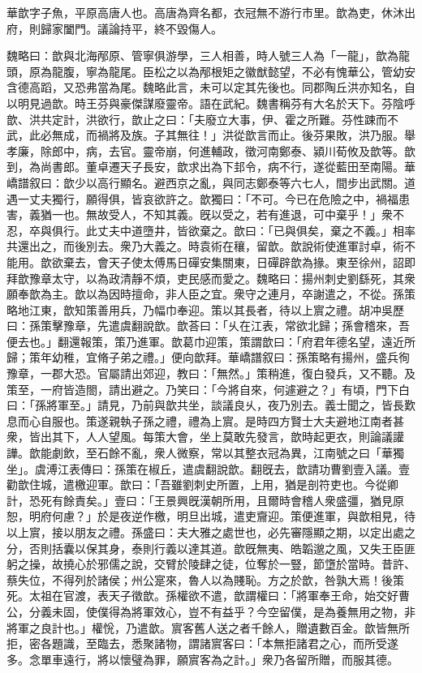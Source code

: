 
\begin{pinyinscope}
華歆字子魚，平原高唐人也。高唐為齊名都，衣冠無不游行市里。歆為吏，休沐出府，則歸家闔門。議論持平，終不毀傷人。

魏略曰：歆與北海邴原、管寧俱游學，三人相善，時人號三人為「一龍」，歆為龍頭，原為龍腹，寧為龍尾。臣松之以為邴根矩之徽猷懿望，不必有愧華公，管幼安含德高蹈，又恐弗當為尾。魏略此言，未可以定其先後也。同郡陶丘洪亦知名，自以明見過歆。時王芬與豪傑謀廢靈帝。語在武紀。魏書稱芬有大名於天下。芬陰呼歆、洪共定計，洪欲行，歆止之曰：「夫廢立大事，伊、霍之所難。芬性踈而不武，此必無成，而禍將及族。子其無往！」洪從歆言而止。後芬果敗，洪乃服。舉孝廉，除郎中，病，去官。靈帝崩，何進輔政，徵河南鄭泰、潁川荀攸及歆等。歆到，為尚書郎。董卓遷天子長安，歆求出為下邽令，病不行，遂從藍田至南陽。華嶠譜叙曰：歆少以高行顯名。避西京之亂，與同志鄭泰等六七人，間步出武關。道遇一丈夫獨行，願得俱，皆哀欲許之。歆獨曰：「不可。今已在危險之中，禍福患害，義猶一也。無故受人，不知其義。旣以受之，若有進退，可中棄乎！」衆不忍，卒與俱行。此丈夫中道墮井，皆欲棄之。歆曰：「已與俱矣，棄之不義。」相率共還出之，而後別去。衆乃大義之。時袁術在穰，留歆。歆說術使進軍討卓，術不能用。歆欲棄去，會天子使太傅馬日磾安集關東，日磾辟歆為掾。東至徐州，詔即拜歆豫章太守，以為政清靜不煩，吏民感而愛之。魏略曰：揚州刺史劉繇死，其衆願奉歆為主。歆以為因時擅命，非人臣之宜。衆守之連月，卒謝遣之，不從。孫策略地江東，歆知策善用兵，乃幅巾奉迎。策以其長者，待以上賔之禮。胡冲吳歷曰：孫策擊豫章，先遣虞翻說歆。歆荅曰：「乆在江表，常欲北歸；孫會稽來，吾便去也。」翻還報策，策乃進軍。歆葛巾迎策，策謂歆曰：「府君年德名望，遠近所歸；策年幼稚，宜脩子弟之禮。」便向歆拜。華嶠譜叙曰：孫策略有揚州，盛兵徇豫章，一郡大恐。官屬請出郊迎，教曰：「無然。」策稍進，復白發兵，又不聽。及策至，一府皆造閤，請出避之。乃笑曰：「今將自來，何遽避之？」有頃，門下白曰：「孫將軍至。」請見，乃前與歆共坐，談議良乆，夜乃別去。義士聞之，皆長歎息而心自服也。策遂親執子孫之禮，禮為上賔。是時四方賢士大夫避地江南者甚衆，皆出其下，人人望風。每策大會，坐上莫敢先發言，歆時起更衣，則論議讙譁。歆能劇飲，至石餘不亂，衆人微察，常以其整衣冠為異，江南號之曰「華獨坐」。虞溥江表傳曰：孫策在椒丘，遣虞翻說歆。翻旣去，歆請功曹劉壹入議。壹勸歆住城，遣檄迎軍。歆曰：「吾雖劉刺史所置，上用，猶是剖符吏也。今從卿計，恐死有餘責矣。」壹曰：「王景興旣漢朝所用，且爾時會稽人衆盛彊，猶見原恕，明府何慮？」於是夜逆作檄，明旦出城，遣吏齎迎。策便進軍，與歆相見，待以上賔，接以朋友之禮。孫盛曰：夫大雅之處世也，必先審隱顯之期，以定出處之分，否則括囊以保其身，泰則行義以達其道。歆旣無夷、皓韜邈之風，又失王臣匪躬之操，故撓心於邪儒之說，交臂於陵肆之徒，位奪於一豎，節墯於當時。昔許、蔡失位，不得列於諸侯；州公寔來，魯人以為賤恥。方之於歆，咎孰大焉！後策死。太祖在官渡，表天子徵歆。孫權欲不遣，歆謂權曰：「將軍奉王命，始交好曹公，分義未固，使僕得為將軍效心，豈不有益乎？今空留僕，是為養無用之物，非將軍之良計也。」權恱，乃遣歆。賔客舊人送之者千餘人，贈遺數百金。歆皆無所拒，密各題識，至臨去，悉聚諸物，謂諸賔客曰：「本無拒諸君之心，而所受遂多。念單車遠行，將以懷璧為罪，願賔客為之計。」衆乃各留所贈，而服其德。


\end{pinyinscope}
